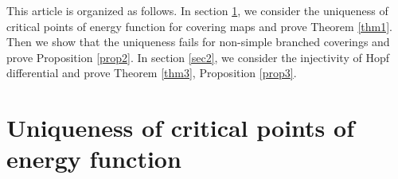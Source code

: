 \documentclass[11pt]{amsart}
\numberwithin{equation}{section}
\theoremstyle{plain}
\theoremstyle{definition}
\theoremstyle{definition}
\begin{document}
This article is organized as follows. In section \ref{sec1}, we consider the uniqueness of critical points of energy function for covering maps and prove Theorem \ref{thm1}. Then we show that the uniqueness fails for non-simple branched coverings and prove Proposition \ref{prop2}. In section \ref{sec2}, we consider the injectivity of Hopf differential and prove Theorem \ref{thm3}, Proposition \ref{prop3}.









\section{Uniqueness of critical points of energy function}\label{sec1}
\end{document}
